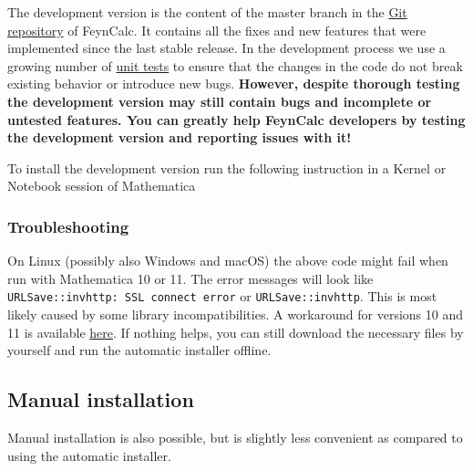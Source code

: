 \documentclass[../FeynCalcManual.tex]{subfiles}
\begin{document}
The development version is the content of the master branch in the
\href{https://github.com/FeynCalc/feyncalc}{Git repository} of FeynCalc.
It contains all the fixes and new features that were implemented since
the last stable release. In the development process we use a growing
number of
\href{https://github.com/FeynCalc/feyncalc/tree/master/Tests}{unit
tests} to ensure that the changes in the code do not break existing
behavior or introduce new bugs. \textbf{However, despite thorough
testing the development version may still contain bugs and incomplete or
untested features. You can greatly help FeynCalc developers by testing
the development version and reporting issues with it!}

To install the development version run the following instruction in a
Kernel or Notebook session of Mathematica

\begin{Shaded}
\begin{Highlighting}[]
\OperatorTok{[}\OperatorTok{]}
\OperatorTok{[}\OtherTok{{-}\textgreater{}} \OperatorTok{]}
\end{Highlighting}
\end{Shaded}

\subsubsection{Troubleshooting}\label{troubleshooting}

On Linux (possibly also Windows and macOS) the above code might fail
when run with Mathematica 10 or 11. The error messages will look like
\texttt{URLSave::invhttp: SSL connect error} or
\texttt{URLSave::invhttp}. This is most likely caused by some library
incompatibilities. A workaround for versions 10 and 11 is available
\href{https://mathematica.stackexchange.com/questions/212453/urlsave-in-mathematica-10-and-11-on-linux}{here}.
If nothing helps, you can still download the necessary files by yourself
and run the automatic installer offline.

\subsection{Manual installation}\label{manual-installation}

Manual installation is also possible, but is slightly less convenient as
compared to using the automatic installer.
\end{document}
